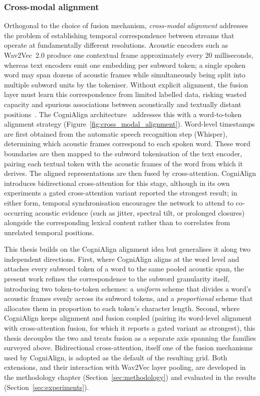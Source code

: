 \subsubsection{Cross-modal alignment}

Orthogonal to the choice of fusion mechanism, \emph{cross-modal alignment} addresses the problem of establishing temporal correspondence between streams that operate at fundamentally different resolutions.
Acoustic encoders such as Wav2Vec~2.0 produce one contextual frame approximately every 20 milliseconds, whereas text encoders emit one embedding per subword token; a single spoken word may span dozens of acoustic frames while simultaneously being split into multiple subword units by the tokeniser.
Without explicit alignment, the fusion layer must learn this correspondence from limited labelled data, risking wasted capacity and spurious associations between acoustically and textually distant positions~\cite{ortiz2025cognialign}.
The CogniAlign architecture~\cite{ortiz2025cognialign} addresses this with a word-to-token alignment strategy (Figure~\ref{fig:cross_modal_alignment}).
Word-level timestamps are first obtained from the automatic speech recognition step (Whisper), determining which acoustic frames correspond to each spoken word.
These word boundaries are then mapped to the subword tokenisation of the text encoder, pairing each textual token with the acoustic frames of the word from which it derives.
The aligned representations are then fused by cross-attention. CogniAlign introduces bidirectional cross-attention for this stage, although in its own experiments a gated cross-attention variant reported the strongest result; in either form, temporal synchronisation encourages the network to attend to co-occurring acoustic evidence (such as jitter, spectral tilt, or prolonged closures) alongside the corresponding lexical content rather than to correlates from unrelated temporal positions.

This thesis builds on the CogniAlign alignment idea but generalises it along two independent directions. First, where CogniAlign aligns at the word level and attaches every subword token of a word to the same pooled acoustic span, the present work refines the correspondence to the subword granularity itself, introducing two token-to-token schemes: a \emph{uniform} scheme that divides a word's acoustic frames evenly across its subword tokens, and a \emph{proportional} scheme that allocates them in proportion to each token's character length. Second, where CogniAlign keeps alignment and fusion coupled (pairing its word-level alignment with cross-attention fusion, for which it reports a gated variant as strongest), this thesis decouples the two and treats fusion as a separate axis spanning the families surveyed above. Bidirectional cross-attention, itself one of the fusion mechanisms used by CogniAlign, is adopted as the default of the resulting grid. Both extensions, and their interaction with Wav2Vec layer pooling, are developed in the methodology chapter (Section~\ref{sec:methodology}) and evaluated in the results (Section~\ref{sec:experiments}).

